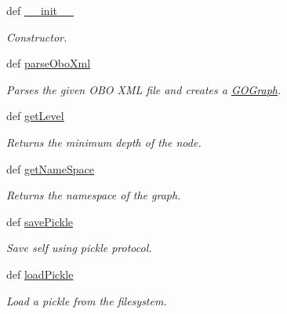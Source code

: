 \begin{DoxyCompactItemize}
\item 
def \hyperlink{class_g_o_graph_1_1_g_o_graph_afc10d41165dd1ae6c4cce09102542122}{\_\-\_\-init\_\-\_\-}
\begin{DoxyCompactList}\small\item\em Constructor. \item\end{DoxyCompactList}\item 
def \hyperlink{class_g_o_graph_1_1_g_o_graph_ac368b1e74799f1947d195e3e2bf7074c}{parseOboXml}
\begin{DoxyCompactList}\small\item\em Parses the given OBO XML file and creates a \hyperlink{class_g_o_graph_1_1_g_o_graph}{GOGraph}. \item\end{DoxyCompactList}\item 
def \hyperlink{class_g_o_graph_1_1_g_o_graph_aff70b5975f6e755e3304cfc3d4ef91a0}{getLevel}
\begin{DoxyCompactList}\small\item\em Returns the minimum depth of the node. \item\end{DoxyCompactList}\item 
\hypertarget{class_g_o_graph_1_1_g_o_graph_aeef340ff2a82454a8d92d9711fd7a92b}{
def \hyperlink{class_g_o_graph_1_1_g_o_graph_aeef340ff2a82454a8d92d9711fd7a92b}{getNameSpace}}
\label{class_g_o_graph_1_1_g_o_graph_aeef340ff2a82454a8d92d9711fd7a92b}

\begin{DoxyCompactList}\small\item\em Returns the namespace of the graph. \item\end{DoxyCompactList}\item 
def \hyperlink{class_g_o_graph_1_1_g_o_graph_ad97c179c4ec3d79a3092810ba1fbc241}{savePickle}
\begin{DoxyCompactList}\small\item\em Save self using pickle protocol. \item\end{DoxyCompactList}\item 
def \hyperlink{class_g_o_graph_1_1_g_o_graph_ada6b7d590cfca9d4baec8d082577ac21}{loadPickle}
\begin{DoxyCompactList}\small\item\em Load a pickle from the filesystem. \item\end{DoxyCompactList}\end{DoxyCompactItemize}
